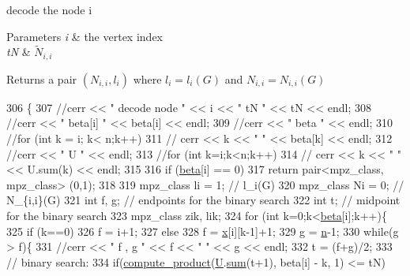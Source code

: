 decode the node i 


\begin{DoxyParams}{Parameters}
{\em i} & the vertex index \\
\hline
{\em tN} & $\tilde{N}_{i,i}$ \\
\hline
\end{DoxyParams}
\begin{DoxyReturn}{Returns}
a pair $(N_{i,i}, l_i)$ where $l_i = l_i(G)$ and $N_{i,i} = N_{i,i}(G)$ 
\end{DoxyReturn}

\begin{DoxyCode}
306 \{
307   \textcolor{comment}{//cerr << " decode node " << i << " tN " << tN << endl;}
308   \textcolor{comment}{//cerr << " beta[i] " << beta[i] << endl;}
309   \textcolor{comment}{//cerr << " beta " << endl;}
310   \textcolor{comment}{//for (int k = i; k< n;k++)}
311   \textcolor{comment}{//  cerr << k << " " << beta[k] << endl;}
312   \textcolor{comment}{//cerr << " U " << endl;}
313   \textcolor{comment}{//for (int k=i;k<n;k++)}
314   \textcolor{comment}{//  cerr << k << " " << U.sum(k) << endl;}
315 
316   \textcolor{keywordflow}{if} (\hyperlink{classgraph__decoder_aa57c11e4c09c52101682ff83286162f7}{beta}[i] == 0)
317     \textcolor{keywordflow}{return} pair<mpz\_class, mpz\_class> (0,1);
318 
319   mpz\_class li = 1; \textcolor{comment}{// l\_i(G)}
320   mpz\_class Ni = 0; \textcolor{comment}{// N\_\{i,i\}(G)}
321   \textcolor{keywordtype}{int} f, g; \textcolor{comment}{// endpoints for the binary search}
322   \textcolor{keywordtype}{int} t; \textcolor{comment}{// midpoint for the binary search}
323   mpz\_class zik, lik; 
324   \textcolor{keywordflow}{for} (\textcolor{keywordtype}{int} k=0;k<\hyperlink{classgraph__decoder_aa57c11e4c09c52101682ff83286162f7}{beta}[i];k++)\{
325     \textcolor{keywordflow}{if} (k==0)
326       f = i+1;
327     \textcolor{keywordflow}{else}
328       f = \hyperlink{classgraph__decoder_aa3f2776afe387668cf7f68109428e14e}{x}[i][k-1]+1;
329     g = \hyperlink{classgraph__decoder_a6bc1e72b2f7a913d14b789a6c2d92c1e}{n}-1;
330     \textcolor{keywordflow}{while}(g > f)\{
331       \textcolor{comment}{//cerr << " f , g " << f << " " << g << endl;}
332       t = (f+g)/2;
333       \textcolor{comment}{// binary search:}
334       \textcolor{keywordflow}{if}(\hyperlink{compression__helper_8cpp_ae2afb43aabe50f7d42aae8f82b5a35f4}{compute\_product}(\hyperlink{classgraph__decoder_a2fa9fec2cef06aaa410e57fb59d5c1ad}{U}.\hyperlink{classreverse__fenwick__tree_a672731fd6395b4853430073a099a80e6}{sum}(t+1), beta[i] - k, 1) <= tN)

\end{DoxyCode}
